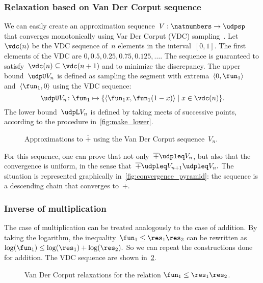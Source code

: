 \subsubsection*{Relaxation based on Van Der Corput sequence}

We can easily create an approximation sequence~$V:\natnumbers\to\udpsp$
that converges monotonically using Var Der Corput (VDC) sampling~\cite[Section 5.2]{LaValle2006Planning}.
Let~$\vdc(n)$ be the VDC sequence of~$n$ elements in the interval~$[0,1]$.
The first elements of the VDC are $0,0.5,0.25,0.75,0.125,\dots$.
The sequence is guaranteed to satisfy~$\vdc(n)\subseteq\vdc(n+1)$
and to minimize the discrepancy. The upper bound~$\udpU V_{n}$
is defined as sampling the segment with extrema~$\left\langle 0,\fun_{1}\right\rangle $
and~$\left\langle \fun_{1},0\right\rangle $ using the VDC sequence:
\[
    \udpU V_{n}\colon\fun_{1}\mapsto\{\left\langle \fun_{1}x,\fun_{1}(1-x)\right\rangle \mid x\in\vdc(n)\}.
\]
The lower bound~$\udpL V_{n}$ is defined by taking meets of successive
points, according to the procedure in~\cref{fig:make_lower}.

\begin{figure}[h]
    \centering
    \caption{Approximations to $\overline{+}$ using the Van Der
    Corput sequence~$V_{n}$.}
    \label{fig:Vn}
\end{figure}

For this sequence, one can prove that not only~$\overline{+}\udpleq V_{n}$,
but also that the convergence is uniform, in the sense that~$\overline{+}\udpleq V_{n+1}\udpleq V_{n}.$
The situation is represented graphically in~\cref{fig:convergence_pyramid}:
the sequence is a descending chain that converges to~$\overline{+}$.

\subsubsection{Inverse of multiplication}

The case of multiplication can be treated analogously to the case
of addition. By taking the logarithm, the inequality~$\fun_{1}\leq\res_{1}\res_{2}$
can be rewritten as~$\log(\fun_{1})\leq\log(\res_{1})+\log(\res_{2}).$
So we can repeat the constructions done for addition. The VDC sequence
are shown in~\cref{fig:approx_invmult}.

\begin{figure}[h]
    \centering
    \caption{Van Der Corput relaxations for the relation
        $\fun_{1}\leq\res_{1}\res_{2}$.}
    \label{fig:approx_invmult}
\end{figure}

